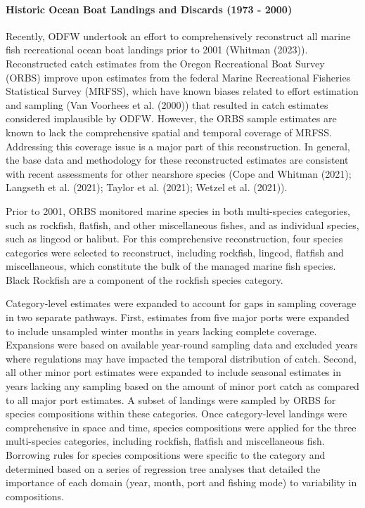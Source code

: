 \documentclass[11pt,
  letterpaper,
]{article}
\begin{document}
\hypertarget{historic-ocean-boat-landings-and-discards-1973---2000}{%
\paragraph{Historic Ocean Boat Landings and Discards (1973 - 2000)}\label{historic-ocean-boat-landings-and-discards-1973---2000}}

Recently, ODFW undertook an effort to comprehensively reconstruct all marine fish recreational ocean boat landings prior to 2001 (Whitman (2023)). Reconstructed catch estimates from the Oregon Recreational Boat Survey (ORBS) improve upon estimates from the federal Marine Recreational Fisheries Statistical Survey (MRFSS), which have known biases related to effort estimation and sampling (Van Voorhees et al. (2000)) that resulted in catch estimates considered implausible by ODFW. However, the ORBS sample estimates are known to lack the comprehensive spatial and temporal coverage of MRFSS. Addressing this coverage issue is a major part of this reconstruction. In general, the base data and methodology for these reconstructed estimates are consistent with recent assessments for other nearshore species (Cope and Whitman (2021); Langseth et al. (2021); Taylor et al. (2021); Wetzel et al. (2021)).

Prior to 2001, ORBS monitored marine species in both multi-species categories, such as rockfish, flatfish, and other miscellaneous fishes, and as individual species, such as lingcod or halibut. For this comprehensive reconstruction, four species categories were selected to reconstruct, including rockfish, lingcod, flatfish and miscellaneous, which constitute the bulk of the managed marine fish species. Black Rockfish are a component of the rockfish species category.

Category-level estimates were expanded to account for gaps in sampling coverage in two separate pathways. First, estimates from five major ports were expanded to include unsampled winter months in years lacking complete coverage. Expansions were based on available year-round sampling data and excluded years where regulations may have impacted the temporal distribution of catch. Second, all other minor port estimates were expanded to include seasonal estimates in years lacking any sampling based on the amount of minor port catch as compared to all major port estimates. A subset of landings were sampled by ORBS for species compositions within these categories. Once category-level landings were comprehensive in space and time, species compositions were applied for the three multi-species categories, including rockfish, flatfish and miscellaneous fish. Borrowing rules for species compositions were specific to the category and determined based on a series of regression tree analyses that detailed the importance of each domain (year, month, port and fishing mode) to variability in compositions.
\end{document}
